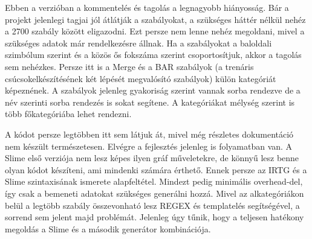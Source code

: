 Ebben a verzióban a kommentelés és tagolás a legnagyobb hiányosság. 
Bár a projekt jelenlegi tagjai jól átlátják a szabályokat, a szükséges háttér nélkül nehéz a 2700 szabály között eligazodni. 
Ezt persze nem lenne nehéz megoldani, mivel a szükséges adatok már rendelkezésre állnak. 
Ha a szabályokat a baloldali szimbólum szerint és a közös ős fokszáma szerint csoportosítjuk, akkor a tagolás sem nehézkes. 
Persze itt is a Merge és a BAR szabályok (a trenáris csúcsokelkészítésének két lépését megvalósító szabályok) külön kategóriát képeznének. 
A szabályok jelenleg gyakoriság szerint vannak sorba rendezve de a név szerinti sorba rendezés is sokat segítene. 
A kategóriákat mélység szerint is több főkategóriába lehet rendezni.

A kódot persze legtöbben itt sem látjuk át, mivel még részletes dokumentáció nem készült természetesen.
Elvégre a fejlesztés jelenleg is folyamatban van. 
A Slime első verziója nem lesz képes ilyen gráf műveletekre, de könnyű lesz benne olyan kódot készíteni, ami mindenki számára érthető.
Ennek persze az IRTG és a Slime szintaxisának ismerete alapfeltétel. 
Mindezt pedig minimális overhead-del, így csak a bemeneti adatokat szükséges generálni hozzá. 
Mivel az alkategóriákon belül a legtöbb szabály összevonható lesz REGEX és templatelés segítségével, a sorrend sem jelent majd problémát.
Jelenleg úgy tűnik, hogy a teljesen hatékony megoldás a Slime és a második generátor kombinációja.